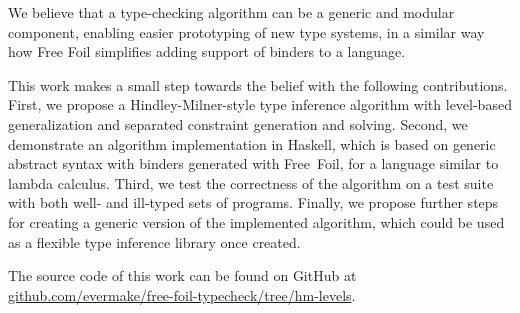 We believe that a type-checking algorithm can be a generic and modular component, enabling easier prototyping of new type systems, in a similar way how Free Foil simplifies adding support of binders to a language.

This work makes a small step towards the belief with the following contributions. First, we propose a Hindley-Milner-style type inference algorithm with level-based generalization and separated constraint generation and solving. Second, we demonstrate an algorithm implementation in Haskell, which is based on generic abstract syntax with binders generated with Free~Foil, for a language similar to lambda calculus. Third, we test the correctness of the algorithm on a test suite with both well- and ill-typed sets of programs. Finally, we propose further steps for creating a generic version of the implemented algorithm, which could be used as a flexible type inference library once created.

The source code of this work can be found on GitHub at \href{https://github.com/evermake/free-foil-typecheck/tree/hm-levels}{github.com/evermake/free-foil-typecheck/tree/hm-levels}.
